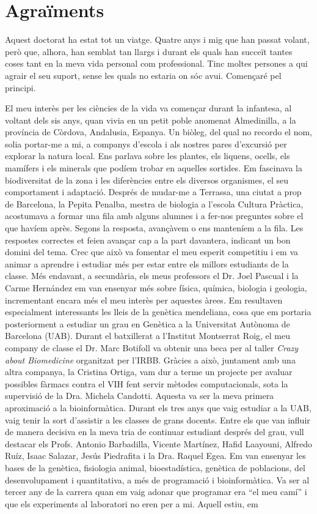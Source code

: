\chapter*{Agraïments} %

Aquest doctorat ha estat tot un viatge. Quatre anys i mig que han passat volant, però que, alhora, han semblat tan llargs i durant els quals han succeït tantes coses tant en la meva vida personal com professional. Tinc moltes persones a qui agrair el seu suport, sense les quals no estaria on sóc avui. Començaré pel principi.

El meu interès per les ciències de la vida va començar durant la infantesa, al voltant dels sis anys, quan vivia en un petit poble anomenat Almedinilla, a la província de Còrdova, Andalusia, Espanya. Un biòleg, del qual no recordo el nom, solia portar-me a mi, a companys d'escola i als nostres pares d'excursió per explorar la natura local. Ens parlava sobre les plantes, els liquens, ocells, els mamífers i els minerals que podíem trobar en aquelles sortides. Em fascinava la biodiversitat de la zona i les diferències entre els diversos organismes, el seu comportament i adaptació. Després de mudar-me a Terrassa, una ciutat a prop de Barcelona, la Pepita Penalba, mestra de biologia a l'escola Cultura Pràctica, acostumava a formar una fila amb alguns alumnes i a fer-nos preguntes sobre el que havíem après. Segons la resposta, avançàvem o ens manteníem a la fila. Les respostes correctes et feien avançar cap a la part davantera, indicant un bon domini del tema. Crec que això va fomentar el meu esperit competitiu i em va animar a aprendre i estudiar més per estar entre els millors estudiants de la classe. Més endavant, a secundària, els meus professors el Dr. Joel Pascual i la Carme Hernández em van ensenyar més sobre física, química, biologia i geologia, incrementant encara més el meu interès per aquestes àrees. Em resultaven especialment interessants les lleis de la genètica mendeliana, cosa que em portaria posteriorment a estudiar un grau en Genètica a la Universitat Autònoma de Barcelona (UAB). Durant el batxillerat a l'Institut Montserrat Roig, el meu company de classe el Dr. Marc Botifoll va obtenir una beca per al taller \textit{Crazy about Biomedicine} organitzat per l'IRBB. Gràcies a això, juntament amb una altra companya, la Cristina Ortiga, vam dur a terme un projecte per avaluar possibles fàrmacs contra el VIH fent servir mètodes computacionals, sota la supervisió de la Dra. Michela Candotti. Aquesta va ser la meva primera aproximació a la bioinformàtica. Durant els tres anys que vaig estudiar a la UAB, vaig tenir la sort d'assistir a les classes de grans docents. Entre els que van influir de manera decisiva en la meva tria de continuar estudiant després del grau, vull destacar els Profs. Antonio Barbadilla, Vicente Martínez, Hafid Laayouni, Alfredo Ruíz, Isaac Salazar, Jesús Piedrafita i la Dra. Raquel Egea. Em van ensenyar les bases de la genètica, fisiologia animal, bioestadística, genètica de poblacions, del desenvolupament i quantitativa, a més de programació i bioinformàtica. Va ser al tercer any de la carrera quan em vaig adonar que programar era ``el meu camí'' i que els experiments al laboratori no eren per a mi. Aquell estiu, em 